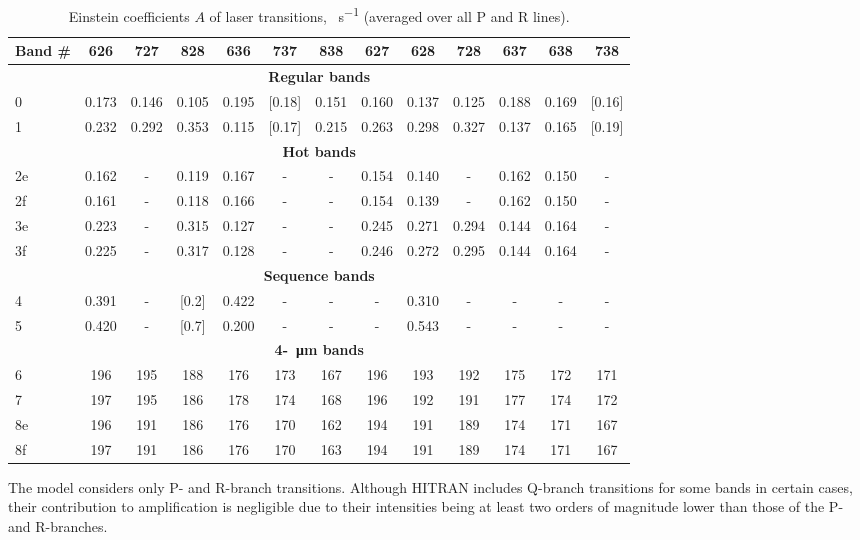 \begin{table}
\caption{Einstein coefficients $A$ of laser transitions, \SI{}{\second^{-1}} (averaged over all P and R lines).}
\label{table:A}
\centering
\begin{tabular}{lcccccccccccc}
\hline
Band \# & 626   & 727 & 828 & 636 & 737 & 838 & 627 & 628 & 728 & 637 & 638 & 738 \\
\hline
\multicolumn{13}{c}{\textbf{Regular bands}}                                     \\
0  & 0.173 & 0.146 & 0.105 & 0.195 & [0.18] & 0.151 & 0.160 & 0.137 & 0.125 & 0.188 & 0.169 & [0.16] \\
1  & 0.232 & 0.292 & 0.353 & 0.115 & [0.17] & 0.215 & 0.263 & 0.298 & 0.327 & 0.137 & 0.165 & [0.19] \\
\multicolumn{13}{c}{\textbf{Hot bands}}                                         \\
2e & 0.162 & - & 0.119 & 0.167 & - & - & 0.154 & 0.140 & - & 0.162 & 0.150 & - \\
2f & 0.161 & - & 0.118 & 0.166 & - & - & 0.154 & 0.139 & - & 0.162 & 0.150 & - \\
3e & 0.223 & - & 0.315 & 0.127 & - & - & 0.245 & 0.271 & 0.294 & 0.144 & 0.164 & - \\
3f & 0.225 & - & 0.317 & 0.128 & - & - & 0.246 & 0.272 & 0.295 & 0.144 & 0.164 & - \\
\multicolumn{13}{c}{\textbf{Sequence bands}}                                    \\
4  & 0.391 & - & [0.2] & 0.422 & - & - & - & 0.310 & - & - & - & - \\
5  & 0.420 & - & [0.7] & 0.200 & - & - & - & 0.543 & - & - & - & - \\
\multicolumn{13}{c}{\textbf{4-\SI{}{\micro\meter} bands}}                       \\
6  & 196   & 195 & 188 & 176 & 173 & 167 & 196 & 193 & 192 & 175 & 172 & 171 \\
7  & 197   & 195 & 186 & 178 & 174 & 168 & 196 & 192 & 191 & 177 & 174 & 172 \\
8e & 196   & 191 & 186 & 176 & 170 & 162 & 194 & 191 & 189 & 174 & 171 & 167 \\
8f & 197   & 191 & 186 & 176 & 170 & 163 & 194 & 191 & 189 & 174 & 171 & 167 \\
\hline
\end{tabular}
\end{table}

The model considers only P- and R-branch transitions. Although HITRAN includes Q-branch transitions for some bands in certain cases, their contribution to amplification is negligible due to their intensities being at least two orders of magnitude lower than those of the P- and R-branches.

